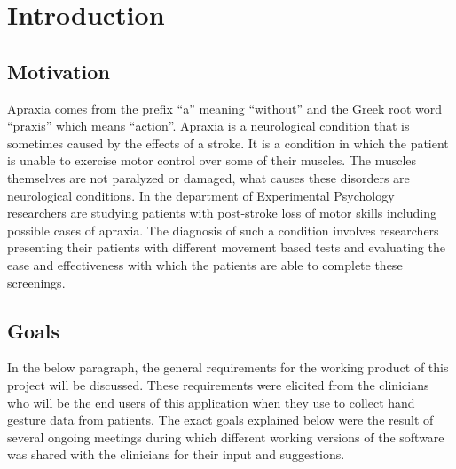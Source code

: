 \chapter{Introduction}

\label{Chapter1_introduction} 

\section{Motivation}
Apraxia comes from the prefix “a” meaning “without” and the  Greek root word “praxis” which means “action”. Apraxia is a neurological condition that is sometimes caused by the effects of a stroke. It is a condition in which the patient is unable to exercise motor control over some of their muscles. The muscles themselves are not paralyzed or damaged, what causes these disorders are neurological conditions. In the department of Experimental Psychology researchers are studying patients with post-stroke loss of motor skills including possible cases of apraxia. The diagnosis of such a condition involves researchers presenting their patients with different movement based tests and evaluating the ease and effectiveness with which the patients are able to complete these screenings.  
	
\section{Goals}
In the below paragraph, the general requirements for the working product of this project will be discussed. These requirements were elicited from the clinicians who will be the end users of this application when they use to collect hand gesture data from patients. The exact goals explained below were the result of several ongoing meetings during which different working versions of the software was shared with the clinicians for their input and suggestions.

